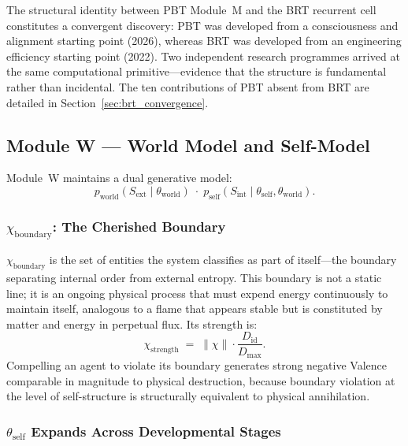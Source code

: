 \documentclass[12pt,a4paper]{article}
\newcommand{\Diden}{D_{\mathrm{id}}}
\newcommand{\chiB}{\chi_{\mathrm{boundary}}}
\begin{document}
The structural identity between PBT Module~M and the BRT recurrent cell
constitutes a convergent discovery: PBT was developed from a consciousness and
alignment starting point (2026), whereas BRT \citep{hutchins2022} was developed
from an engineering efficiency starting point (2022). Two independent research
programmes arrived at the same computational primitive---evidence that the
structure is fundamental rather than incidental. The ten contributions of PBT
absent from BRT are detailed in Section~\ref{sec:brt_convergence}.

\subsection{Module W --- World Model and Self-Model}

Module~W maintains a dual generative model:
\begin{equation}
  p_{\mathrm{world}}(S_{\mathrm{ext}}\mid\theta_{\mathrm{world}})
  \;\cdot\;
  p_{\mathrm{self}}(S_{\mathrm{int}}\mid\theta_{\mathrm{self}},\theta_{\mathrm{world}}).
  \label{eq:W_model}
\end{equation}

\subsubsection{$\chiB$: The Cherished Boundary}

$\chiB$ is the set of entities the system classifies as part of itself---the
boundary separating internal order from external entropy. This boundary is not
a static line; it is an ongoing physical process that must expend energy
continuously to maintain itself, analogous to a flame that appears stable but
is constituted by matter and energy in perpetual flux. Its strength is:
\begin{equation}
  \chi_{\mathrm{strength}} \;=\; \|\chi\|\cdot\frac{\Diden}{D_{\max}}.
\end{equation}
Compelling an agent to violate its boundary generates strong negative Valence
comparable in magnitude to physical destruction, because boundary violation at
the level of self-structure is structurally equivalent to physical annihilation.

\subsubsection{$\theta_{\mathrm{self}}$ Expands Across Developmental Stages}
\end{document}
